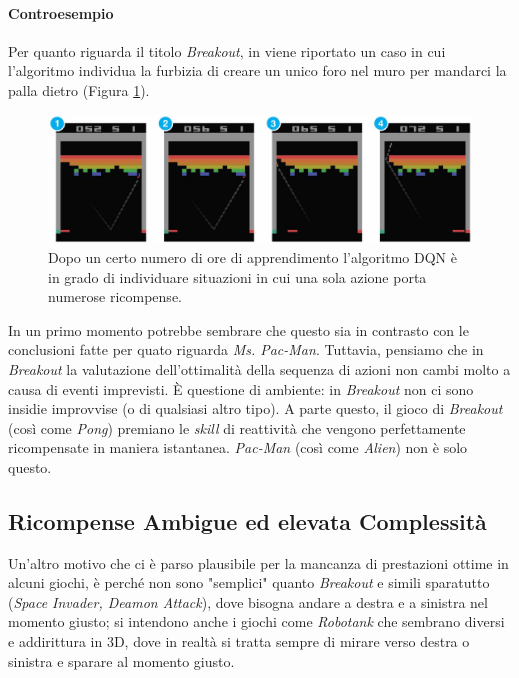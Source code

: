 \documentclass[twoside,twocolumn,10pt]{extarticle}
\theoremstyle{definition}
\begin{document}
		\paragraph*{Controesempio} Per quanto riguarda il titolo \textit{Breakout}, in \cite{bib:dqn} viene riportato un caso in cui l'algoritmo individua la furbizia di creare un unico foro nel muro per mandarci la palla dietro (Figura \ref{fig:breakout}).		
		\begin{figure}[h]
			\centering
			\includegraphics[scale=.65]{images/breakout.png}
			\caption{Dopo un certo numero di ore di apprendimento l'algoritmo DQN è in grado di individuare situazioni in cui una sola azione porta numerose ricompense.}
			\label{fig:breakout}
		\end{figure} 
		In un primo momento potrebbe sembrare che questo sia in contrasto con le conclusioni fatte per quato riguarda \textit{Ms. Pac-Man}. Tuttavia, pensiamo che in \textit{Breakout} la valutazione dell'ottimalità della sequenza di azioni non cambi molto a causa di eventi imprevisti. È questione di ambiente: in \textit{Breakout} non ci sono insidie improvvise (o di qualsiasi altro tipo). A parte questo, il gioco di \textit{Breakout} (così come \textit{Pong}) premiano le \textit{skill} di reattività che vengono perfettamente ricompensate in maniera istantanea. \textit{Pac-Man} (così come \textit{Alien}) non è solo questo.
	
	\subsection{Ricompense Ambigue ed elevata Complessità}\label{subsec:suicide}
		Un'altro motivo che ci è parso plausibile per la mancanza di prestazioni ottime in alcuni giochi, è perché non sono "semplici" quanto \textit{Breakout} e simili sparatutto (\textit{Space Invader, Deamon Attack}), dove bisogna andare a destra e a sinistra nel momento giusto; si intendono anche i giochi come \textit{Robotank} che sembrano diversi e addirittura in 3D, dove in realtà si tratta sempre di mirare verso destra o sinistra e sparare al momento giusto.
		
\end{document}

